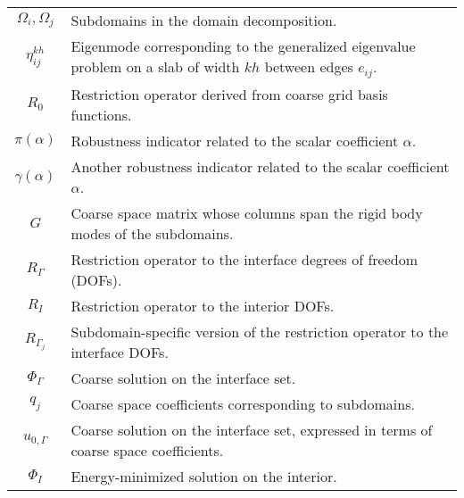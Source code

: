 \begin{longtable}{c p{10cm}}
    $\Omega_i, \Omega_j$            & Subdomains in the domain decomposition.                                                                       \\
    $\eta^{kh}_{ij}$                & Eigenmode corresponding to the generalized eigenvalue problem on a slab of width $kh$ between edges $e_{ij}$. \\
    $R_0$                           & Restriction operator derived from coarse grid basis functions.                                                \\
    $\pi(\alpha)$                   & Robustness indicator related to the scalar coefficient $\alpha$.                                              \\
    $\gamma(\alpha)$                & Another robustness indicator related to the scalar coefficient $\alpha$.                                      \\
    $G$                             & Coarse space matrix whose columns span the rigid body modes of the subdomains.                                \\
    $R_{\Gamma}$                    & Restriction operator to the interface degrees of freedom (DOFs).                                              \\
    $R_I$                           & Restriction operator to the interior DOFs.                                                                    \\
    $R_{\Gamma_j}$                  & Subdomain-specific version of the restriction operator to the interface DOFs.                                 \\
    $\Phi_{\Gamma}$                 & Coarse solution on the interface set.                                                                         \\
    $q_j$                           & Coarse space coefficients corresponding to subdomains.                                                        \\
    $u_{0,\Gamma}$                  & Coarse solution on the interface set, expressed in terms of coarse space coefficients.                        \\
    $\Phi_I$                        & Energy-minimized solution on the interior.                                                                    \\
    \hline
\end{longtable}
\pagestyle{fancy}